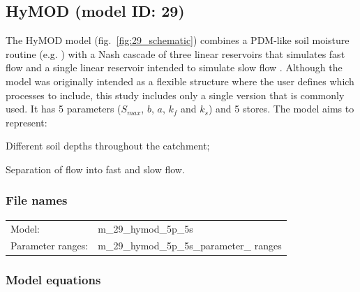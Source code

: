 \subsection{HyMOD (model ID: 29)}
The HyMOD model (fig.~\ref{fig:29_schematic}) combines a PDM-like soil moisture routine (e.g. \citet{Moore2007}) with a Nash cascade of three linear reservoirs that simulates fast flow and a single linear reservoir intended to simulate slow flow \citep{Wagener2001,Boyle2001}. Although the model was originally intended as a flexible structure where the user defines which processes to include, this study includes only a single version that is commonly used. It has 5 parameters ($S_{max}$, $b$, $a$, $k_f$ and $k_s$) and 5 stores. The model aims to represent:

\begin{itemizecompact}
\item Different soil depths throughout the catchment;
\item Separation of flow into fast and slow flow.
\end{itemizecompact}

\subsubsection{File names}
\begin{tabular}{@{}ll}
Model: &m\_29\_hymod\_5p\_5s \\
Parameter ranges: &m\_29\_hymod\_5p\_5s\_parameter\_ ranges \\
\end{tabular}

\subsubsection{Model equations}

